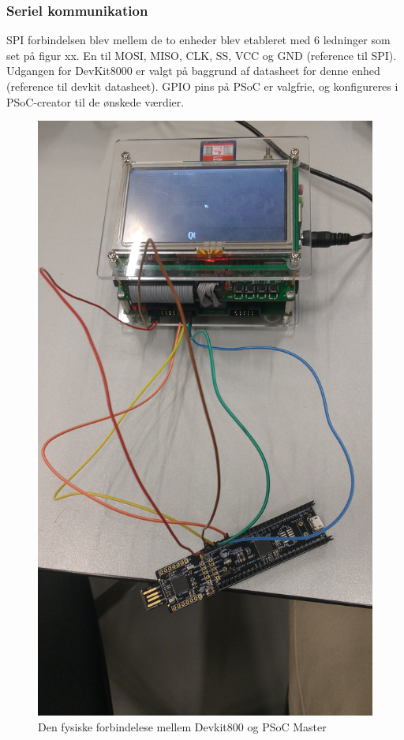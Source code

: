 \subsubsection{Seriel kommunikation}

SPI forbindelsen blev mellem de to enheder blev etableret med 6 ledninger som set på figur xx. En til MOSI, MISO, CLK, SS, VCC og GND (reference til SPI).
Udgangen for DevKit8000 er valgt på baggrund af datasheet for denne enhed (reference til devkit datasheet). GPIO pins på PSoC er valgfrie, og konfigureres 
i PSoC-creator til de ønskede værdier.

\begin{figure}[H]
	\centerline{\includegraphics[scale=0.07]{tex/TeImRe/SPI/Realisering_devkit_psoc}}
	\caption{Den fysiske forbindelese mellem Devkit800 og PSoC Master}
\end{figure}

